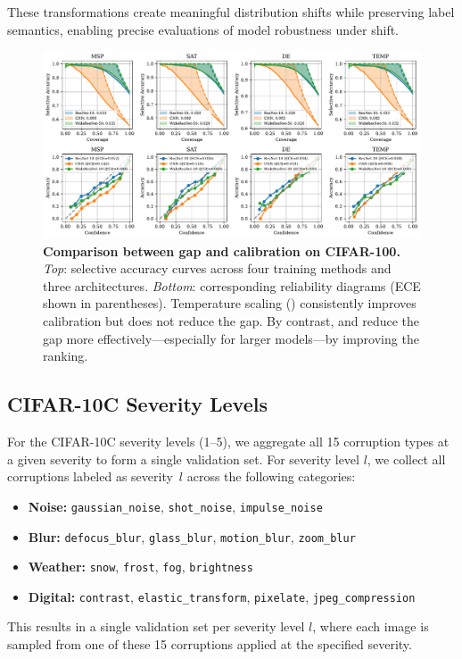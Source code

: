 These transformations create meaningful distribution shifts while preserving label semantics, enabling precise evaluations of model robustness under shift.

\begin{figure}[t]
    \centering
    \includegraphics[width=1\linewidth]{figs/sc_bounds/cifar100_calibration.pdf}
    \caption[Comparison between gap and calibration on CIFAR-100.]{\textbf{Comparison between gap and calibration on CIFAR-100.} 
\emph{Top}: selective accuracy curves across four training methods and three architectures. 
\emph{Bottom}: corresponding reliability diagrams (ECE shown in parentheses).
Temperature scaling (\temp) consistently improves calibration but does not reduce the gap. 
By contrast, \sat and \de reduce the gap more effectively—especially for larger models—by improving the ranking.
}

    \label{fig:cifar100_cal}
\end{figure}

\subsection{CIFAR-10C Severity Levels}

For the CIFAR-10C severity levels (1--5), we aggregate all 15 corruption types at a given severity to form a single validation set. For severity level $l$, we collect all corruptions labeled as severity~$l$ across the following categories:
\begin{itemize}
  \item \textbf{Noise:} \texttt{gaussian\_noise}, \texttt{shot\_noise}, \texttt{impulse\_noise}
  \item \textbf{Blur:} \texttt{defocus\_blur}, \texttt{glass\_blur}, \texttt{motion\_blur}, \texttt{zoom\_blur}
  \item \textbf{Weather:} \texttt{snow}, \texttt{frost}, \texttt{fog}, \texttt{brightness}
  \item \textbf{Digital:} \texttt{contrast}, \texttt{elastic\_transform}, \texttt{pixelate}, \texttt{jpeg\_compression}
\end{itemize}
This results in a single validation set per severity level $l$, where each image is sampled from one of these 15 corruptions applied at the specified severity.


